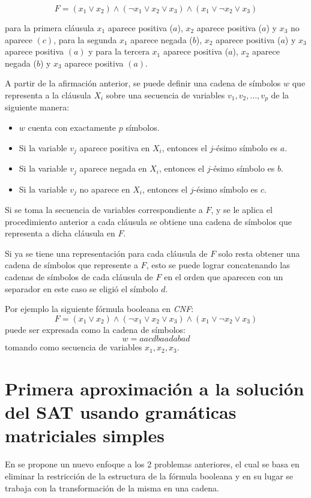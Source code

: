 \documentclass[12pt]{article}
\begin{document}
$$F=(x_1 \vee x_2) \wedge (\neg x_1 \vee x_2 \vee x_3) \wedge (x_1 \vee \neg x_2 \vee x_3)$$

para la primera cláusula $x_1$ aparece positiva ($a$), $x_2$ aparece positiva ($a$) y $x_3$ no aparece $(c)$, para la segunda
$x_1$ aparece negada ($b$), $x_2$ aparece positiva ($a$) y $x_3$ aparece positiva $(a)$ y para la tercera 
$x_1$ aparece positiva ($a$), $x_2$ aparece negada ($b$) y $x_3$ aparece positiva $(a)$.

A partir de la afirmación anterior, se puede definir una cadena de símbolos $w$ que representa a la cláusula $X_i$ sobre una secuencia de variables $v_1,v_2,\ldots,v_p$ de la siguiente manera:

\begin{itemize}
      \item $w$ cuenta con exactamente $p$ símbolos.
      \item Si la variable $v_j$ aparece positiva en $X_i$, entonces el $j$-ésimo símbolo es $a$.
      \item Si la variable $v_j$ aparece negada en $X_i$, entonces el $j$-ésimo símbolo es $b$.
      \item Si la variable $v_j$ no aparece en $X_i$, entonces el $j$-ésimo símbolo es $c$.
\end{itemize}
Si se toma la secuencia de variables correspondiente a $F$, y se le aplica el procedimiento anterior a cada cláusula
se obtiene una cadena de símbolos que representa a dicha cláusula en $F$.

Si ya se tiene una representación para cada cláusula de $F$ solo resta obtener una cadena de símbolos que represente a $F$,
esto se puede lograr concatenando las cadenas de símbolos de cada cláusula de $F$ en el orden que aparecen con un separador
en este caso se eligió el símbolo $d$.

Por ejemplo la siguiente fórmula booleana en \textit{CNF}:
$$F=(x_1 \vee x_2) \wedge (\neg x_1 \vee x_2 \vee x_3) \wedge (x_1 \vee \neg x_2 \vee x_3)$$
puede ser expresada como la cadena de símbolos:
$$w=aacdbaadabad$$
tomando como secuencia de variables $x_1, x_2, x_3$.


\section{Primera aproximación a la solución del SAT usando gramáticas matriciales simples}

En \cite{aSMSAT} se propone un nuevo enfoque a los 2 problemas anteriores, el cual se basa en eliminar la restricción de la estructura de la fórmula booleana y 
en su lugar se trabaja con la transformación de la misma en una cadena.
\end{document}
